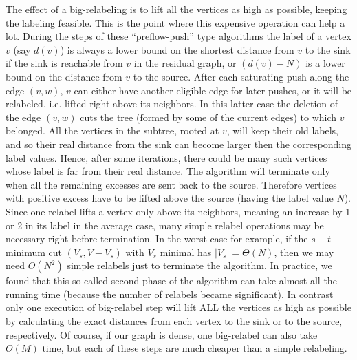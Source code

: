 The effect of a big-relabeling is to lift all the vertices as high
as possible, keeping the labeling feasible. This is the point where
this expensive operation can help a lot.
During the steps of these ``preflow-push'' type algorithms the label
of a vertex $v$ (say $d(v)$) is always a lower bound on the shortest
distance from $v$ to the sink if the sink is reachable from $v$ in the
residual graph, or $(d(v)-N)$ is a lower bound on the distance from
$v$ to the source. After 
each saturating push along the edge $(v, w)$, $v$ can either have
another eligible edge for later pushes, or it will be relabeled, i.e.
lifted right above its neighbors. 
In this latter case the deletion of the edge $(v, w)$ cuts the tree
(formed by some of the current edges) to which $v$ belonged.
All the vertices in the subtree, rooted at $v$, will keep their
old labels, and so their real distance from the sink can become larger then
the corresponding label values. Hence, after some iterations, there could
be many such vertices whose label is far from their real distance.
The algorithm will terminate only when all the remaining excesses are
sent back to the source. Therefore vertices with positive excess
have to be lifted above the source (having the label value $N$).
Since one relabel lifts a
vertex only above its neighbors, meaning an increase by 1 or 2 in its
label in the average case, many
simple relabel operations may be necessary right before termination.  
In the worst case for example, if the $s-t$ minimum cut $(V_s, V - V_s)$
with $V_s$ minimal has $|V_s| = \Theta(N)$, then we may need 
$O(N^2)$ simple relabels just to terminate the algorithm. In practice,
we found that this so called second phase of the algorithm can take
almost all the running time (because the number of relabels became
significant).  In contrast only one execution of
big-relabel step will lift ALL the vertices as high as possible by
calculating the exact distances from each vertex to the sink or to the
source, respectively.
Of course, if our graph is dense, one big-relabel can also take
$O(M)$ time, but each of these steps are much cheaper than a simple
relabeling. 


